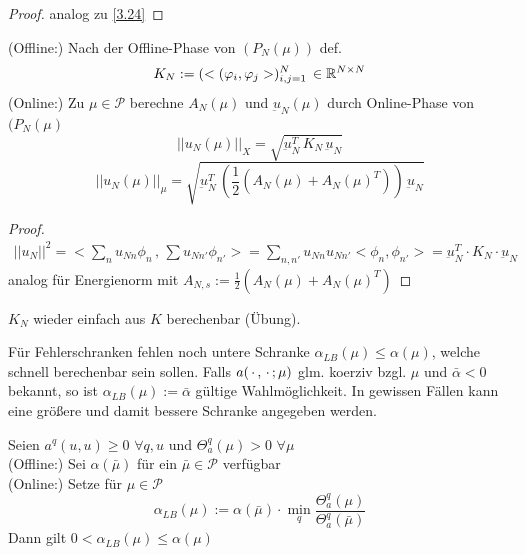 \begin{proof}
	analog zu \ref{3.24}
\end{proof}

\begin{kor}
	(Offline:) Nach der Offline-Phase von $(P_N(\mu))$ def.
	\[
		K_N := (<(\varphi_i,\varphi_j>)_{i,j=1}^N \, \in \mathbb{R}^{N \times N}
	\]
	(Online:) Zu $\mu \in \mathcal{P}$ berechne $A_N(\mu)$ und $\underbar u_N(\mu)$ durch Online-Phase von $(P_N(\mu)$
	\[
		|| u_N(\mu)||_X = \sqrt{\underbar u_N^T \, K_N \, \underbar u_N}
	\]
	\[
		|| u_N(\mu)||_{\mu} = \sqrt{\underbar u_N^T \, (\frac{1}{2} (A_N(\mu) + A_N(\mu)^T)) \, \underbar u_N}
	\]
\end{kor}

\begin{proof}
	\begin{align*}
		||u_N||^2 = <\sum_n u_{Nn} \phi_n \, , \, \sum u_{Nn'} \phi_{n'}> = \sum_{n, n'} u_{Nn} u_{Nn'} <\phi_n, \phi_{n'}> = \underbar u_N^T \cdot K_N \cdot \underbar u_N
	\end{align*}	
	analog für Energienorm mit $A_{N,s} := \frac{1}{2} (A_N(\mu) + A_N(\mu)^T)$
\end{proof}

\begin{bem}
	$K_N$ wieder einfach aus $K$ berechenbar (Übung).
\end{bem}

Für Fehlerschranken fehlen noch untere Schranke $\alpha_{LB} (\mu) \le \alpha (\mu)$, welche schnell berechenbar sein sollen.
Falls $a(\,\cdot\, , \,\cdot\, ; \mu)$ glm. koerziv bzgl. $\mu$ und $\bar{\alpha} < 0$ bekannt, so ist $\alpha_{LB} (\mu) := \bar{\alpha}$ gültige Wahlmöglichkeit.
In gewissen Fällen kann eine größere und damit bessere Schranke angegeben werden.

\begin{satz}
	Seien $a^q(u,u) \geq 0 \,\, \forall q,u$ und $\Theta_a^q (\mu) > 0 \,\, \forall \mu$ \\
	(Offline:) Sei $\alpha(\bar{\mu})$ für ein $\bar{\mu} \in \mathcal{P}$ verfügbar \\
	(Online:) Setze für $\mu \in \mathcal{P}$
	\[
		\alpha_{LB} (\mu) := \alpha(\bar{\mu}) \cdot \min_{q} \frac{\Theta_a^q(\mu)}{\Theta_a^q(\bar{\mu})}
	\]
	Dann gilt $0 < \alpha_{LB} (\mu) \leq \alpha(\mu)$
\end{satz}

